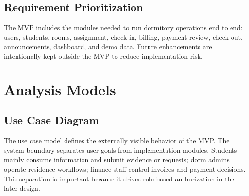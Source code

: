 \documentclass[11pt,a4paper]{article}
\begin{document}
\subsection{Requirement Prioritization}
The MVP includes the modules needed to run dormitory operations end to end: users, students, rooms, assignment, check-in, billing, payment review, check-out, announcements, dashboard, and demo data. Future enhancements are intentionally kept outside the MVP to reduce implementation risk.

\section{Analysis Models}

\subsection{Use Case Diagram}
The use case model defines the externally visible behavior of the MVP. The system boundary separates user goals from implementation modules. Students mainly consume information and submit evidence or requests; dorm admins operate residence workflows; finance staff control invoices and payment decisions. This separation is important because it drives role-based authorization in the later design.
\end{document}
